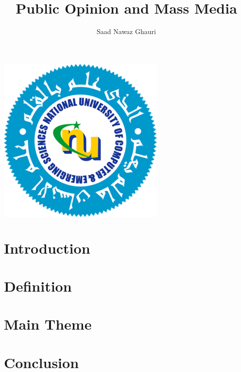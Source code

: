 \documentclass[a4paper,11pt]{article}
\author{Saad Nawaz Ghauri}
\title{Public Opinion and Mass Media}
\begin{document}
\maketitle

\begin{Center}
\includegraphics{nuces_logo.png}
\end{Center}

\tableofcontents


\section{Introduction}

\section{Definition}

\section{Main Theme}

\section{Conclusion}
\end{document}

